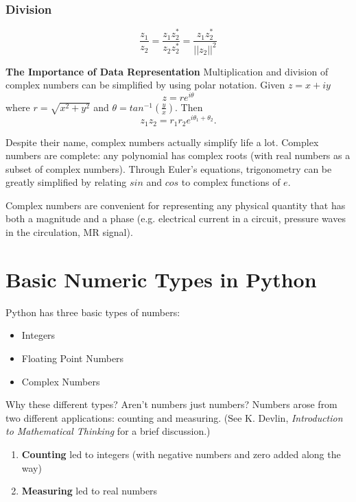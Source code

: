 \subsubsection{Division}
\begin{equation}
\frac{z_1}{z_2} = \frac{z_1z^*_2}{z_2z^*_2}=\frac{z_1z^*_2}{||z_2||^2}
\end{equation}

\textbf{The Importance of Data Representation}
Multiplication and division of complex numbers can be simplified by using polar notation. Given $z=x+iy$
\begin{equation}
z=re^{i\theta}
\end{equation}
where $r=\sqrt{x^2+y^2}$ and $\theta=tan^{-1}(\frac{y}{x})$.
Then
\begin{equation}
z_1z_2 = r_1r_2e^{i\theta_1+\theta_2}.
\end{equation}

Despite their name, complex numbers actually simplify life a lot. Complex numbers are complete: any polynomial has complex roots (with real numbers as a subset of complex numbers). Through Euler's equations, trigonometry can be greatly simplified by relating $sin$ and $cos$ to complex functions of $e$.

Complex numbers are convenient for representing any physical quantity that has both a magnitude and a phase (e.g. electrical current in a circuit, pressure waves in the circulation, MR signal).

\section{Basic Numeric Types in Python}

Python has three basic types of numbers:
\begin{itemize}
    \item Integers
    \item Floating Point Numbers
    \item Complex Numbers
\end{itemize}

Why these different types? Aren't numbers just numbers? Numbers arose from two different applications: counting and measuring. (See K. Devlin, \emph{Introduction to Mathematical Thinking} for a brief discussion.)

\begin{enumerate}
    \item \textbf{Counting} led to integers (with negative numbers and zero added along the way)
    \item \textbf{Measuring} led to real numbers
\end{enumerate}

